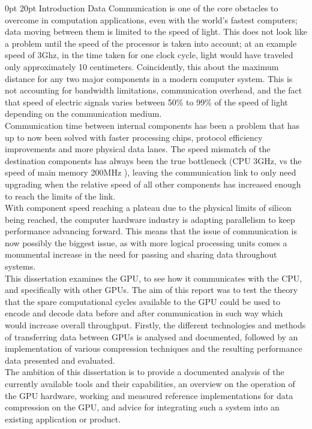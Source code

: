 \documentclass[12pt,a4paper]{article}
\makeatletter
\renewcommand\section{\@startsection {section}{1}{0mm} %
                               {0pt} %
                               {20pt} %
                               {\fontsize{14pt}{1em}\bfseries\newpage}}
\makeatother
\begin{document}
\newpage

\section{Introduction}
Data Communication is one of the core obstacles to overcome in computation applications, even with the world's fastest computers; data moving between them is limited to the speed of light. This does not look like a problem until the speed of the processor is taken into account; at an example speed of 3Ghz, in the time taken for one clock cycle, light would have traveled only approximately 10 centimeters. Coincidently, this about the maximum distance for any two major components in a modern computer system. This is not accounting for bandwidth limitations, communication overhead, and the fact that speed of electric signals varies between 50\% to 99\% of the speed of light depending on the communication medium.
\\
Communication time between internal components has been a problem that has up to now been solved with faster processing chips, protocol efficiency improvements and more physical data lanes. The speed mismatch of the destination components has always been the true bottleneck (CPU 3GHz, vs the speed of main memory 200MHz ), leaving the communication link to only need upgrading when the relative speed of all other components has increased enough to reach the limits of the link.
\\
With component speed reaching a plateau due to the physical limits of silicon being reached, the computer hardware industry is adapting parallelism to keep performance advancing forward. This means that the issue of communication is now possibly the biggest issue, as with more logical processing units comes a monumental increase in the need for passing and sharing data throughout systems.
\\
This dissertation examines the GPU, to see how it communicates with the CPU, and specifically with other GPUs. The aim of this report was to test the theory that the spare computational cycles available to the GPU could be used to encode and decode data before and after communication in such way which would increase overall throughput. Firstly, the different technologies and methods of transferring data between GPUs is analysed and documented, followed by an implementation of various compression techniques and the resulting performance data presented and evaluated.
\\
The ambition of this dissertation is to provide a documented analysis of the currently available tools and their capabilities, an overview on the operation of the GPU hardware, working and measured reference implementations for data compression on the GPU, and advice for integrating such a system into an existing application or product.
\end{document}
